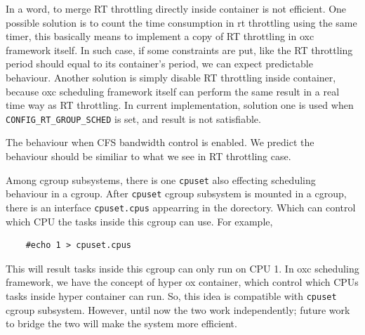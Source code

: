 In a word, to merge RT throttling directly inside container is not efficient.
One possible solution is to count the time consumption in rt throttling using 
the same timer, this basically means to implement a copy of RT throttling 
in oxc framework itself. In such case, if some constraints are put, like
the RT throttling period should equal to its container's period, we can
expect predictable behaviour.
Another solution is simply disable RT throttling inside container, because
oxc scheduling framework itself can perform the same result in a real time
way as RT throttling. 
In current implementation, solution one is used when 
\texttt{CONFIG\_RT\_GROUP\_SCHED} is set, and result is not satisfiable.

The behaviour when CFS bandwidth control is enabled. We predict the behaviour
should be similiar to what we see in RT throttling case.

Among cgroup subsystems, there is one \texttt{cpuset} also effecting scheduling
behaviour in a cgroup.
After \texttt{cpuset} cgroup subsystem is mounted in a cgroup, there is an 
interface \texttt{cpuset.cpus} appearring in the dorectory. Which can control
which CPU the tasks inside this cgroup can use.
For example, 
\begin{lstlisting}
	#echo 1 > cpuset.cpus
\end{lstlisting}
This will result tasks inside this cgroup can only run on CPU 1.
In oxc scheduling framework, we have the concept of hyper ox container, which 
control which CPUs tasks inside hyper container can run. So, this idea is
compatible with \texttt{cpuset} cgroup subsystem. However, until now the two
work independently; future work to bridge the two will make the system more
efficient.

